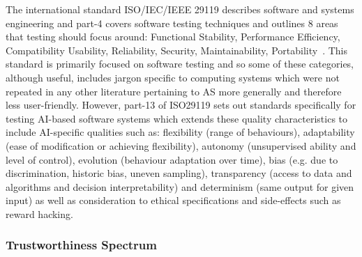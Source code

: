 The international standard ISO/IEC/IEEE 29119 describes software and systems engineering and part-4 covers software testing techniques and outlines 8 areas that testing should focus around: Functional Stability, Performance Efficiency, Compatibility
Usability, Reliability, Security, Maintainability, Portability~\cite{ISO29119}. 
%
This standard is primarily focused on software testing and so some of these categories, although useful, includes jargon specific to computing systems which were not repeated in any other literature pertaining to AS more generally and therefore less user-friendly. However, part-13 of ISO29119 sets out standards specifically for testing AI-based software systems which extends these quality characteristics to include AI-specific qualities such as: flexibility (range of behaviours), adaptability (ease of modification or achieving flexibility), autonomy (unsupervised ability and level of control), evolution (behaviour adaptation over time), bias (e.g. due to discrimination, historic bias, uneven sampling), transparency (access to data and algorithms and decision interpretability) and determinism (same output for given input) as well as consideration to ethical specifications and side-effects such as reward hacking. 



%







\subsubsection{Trustworthiness Spectrum}\label{sec:spectrum}

